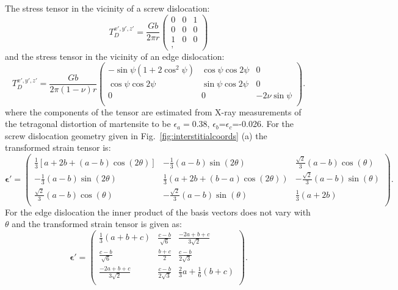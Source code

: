 The stress tensor in the vicinity of a screw dislocation:
%
\begin{equation}
T^{x',y',z'}_{D}=
\frac{Gb}{2\pi r}
\left(
\begin{array}{ccc}
0 & 0 & 1 \\
0 & 0 & 0 \\
1 & 0 & 0 \\,
\end{array}
\right)
\end{equation}
%
and the stress tensor in the vicinity of an edge dislocation:
\begin{equation}
T^{x',y',z'}_{D}=
\frac{Gb}{2\pi(1-\nu)r}
\left(
\begin{array}{ccc}
-\sin\psi(1+2 \cos^{2}\psi) & \cos\psi\cos 2\psi & 0 \\
\cos\psi\cos 2\psi & \sin\psi\cos 2\psi & 0 \\
0 & 0 & -2\nu\sin\psi \\
\end{array}
\right).
\end{equation}
%
where the components of the tensor are estimated from X-ray measurements
of the tetragonal distortion of martensite to be $\epsilon_{a}=0.38$,
$\epsilon_{b}$=$\epsilon_{c}$=-0.026. For the screw dislocation
geometry given in Fig.~\ref{fig:interstitialcoords} (a) the transformed strain
tensor is:
%
%
\begin{equation}
\mathbf{\epsilon}'=\left(
\begin{array}{ccc}
 \frac{1}{3}[a+2 b+(a-b) \cos (2 \theta)] & -\frac{1}{3} (a-b) \sin (2 \theta ) & \frac{\sqrt{2}}{3} (a-b)\cos(\theta )\\
 -\frac{1}{3} (a-b) \sin (2 \theta ) & \frac{1}{3} (a+2 b+(b-a) \cos (2 \theta )) & -\frac{\sqrt{2}}{3}(a-b) \sin (\theta )\\
 \frac{\sqrt{2}}{3} (a-b) \cos (\theta ) & -\frac{\sqrt{2}}{3}(a-b)\sin(\theta ) & \frac{1}{3}(a+2 b)\\
\end{array}
\right).
\end{equation}
%
For the edge dislocation the inner product of the basis vectors does not vary with $\theta$
and the transformed strain tensor is given as:
%
\begin{equation}
\mathbf{\epsilon}'=\left(
\begin{array}{ccc}
 \frac{1}{3} (a+b+c) & \frac{c-b}{\sqrt{6}} & \frac{-2 a+b+c}{3 \sqrt{2}} \\
 \frac{c-b}{\sqrt{6}} & \frac{b+c}{2} & \frac{c-b}{2 \sqrt{3}} \\
 \frac{-2 a+b+c}{3 \sqrt{2}} & \frac{c-b}{2 \sqrt{3}} & \frac{2}{3}a + \frac{1}{6}(b+c) \\
\end{array}
\right).
\end{equation}

